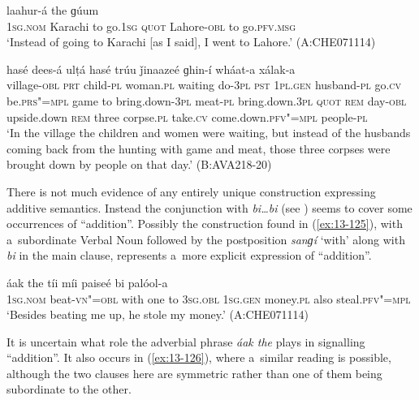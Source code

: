 \begin{exe}
\ex
\label{ex:13-123}
 laahur-á the  ɡúum \\
\textsc{1sg.nom} Karachi to go.\textsc{1sg} \textsc{quot} Lahore-\textsc{obl} to go.\textsc{pfv.msg} \\
\glt `Instead of going to Karachi [as I said], I went to Lahore.' (A:CHE071114)

\ex
\label{ex:13-124}
 hasé	dees-á ulṭá hasé trúu ǰinaazeé ɡhin-í wháat-a xálak-a \\
village-\textsc{obl} \textsc{prt} child-\textsc{pl} woman.\textsc{pl} waiting do-\textsc{3pl}
\textsc{pst} \textsc{1pl.gen} husband-\textsc{pl} go.\textsc{cv} be.\textsc{prs"=mpl} game to
bring.down-\textsc{3pl} meat-\textsc{pl} bring.down.\textsc{3pl} \textsc{quot}  \textsc{rem} day-\textsc{obl} upside.down \textsc{rem} three corpse.\textsc{pl} take.\textsc{cv} come.down.\textsc{pfv"=mpl} people-\textsc{pl} \\
\glt `In the village the children and women were waiting, but instead of the husbands coming back from the hunting with game and meat, those three corpses were brought down by people on that day.' (B:AVA218-20) 
\end{exe}

 There is not much evidence of any entirely unique construction expressing additive semantics. Instead the conjunction with \textit{bi{\ldots}bi} (see ) seems to cover some occurrences of ``addition''. Possibly the construction found in (\ref{ex:13-125}), with a~subordinate Verbal Noun followed by the postposition \textit{sanɡí} `with' along with \textit{bi} in the main clause, represents a~more explicit expression of ``addition''. 

\begin{exe}
\ex
\label{ex:13-125}
 áak the tíi míi  paiseé bi palóol-a \\
\textsc{1sg.nom} beat-\textsc{vn"=obl} with one to \textsc{3sg.obl} \textsc{1sg.gen} money.\textsc{pl}  also steal.\textsc{pfv"=mpl} \\
\glt `Besides beating me up, he stole my money.' (A:CHE071114) 
\end{exe}

It is uncertain what role the adverbial phrase \textit{áak the} plays in signalling ``addition''. It also occurs in (\ref{ex:13-126}), where a~similar reading is possible, although the two clauses here are symmetric rather than one of them being subordinate to the other.

